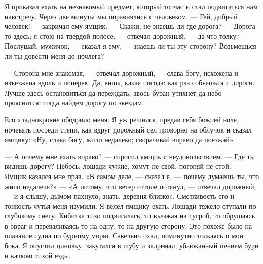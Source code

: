 Я приказал ехать на незнакомый предмет, который тотчас и стал подвигаться нам навстречу. Через две минуты мы поравнялись с человеком.
— Гей, добрый человек! — закричал ему ямщик. — Скажи, не знаешь ли где дорога?
— Дорога-то здесь; я стою на твердой полосе, — отвечал дорожный, — да что толку?
— Послушай, мужичок, — сказал я ему, — знаешь ли ты эту сторону? Возьмешься ли ты довести меня до ночлега?

— Сторона мне знакомая, — отвечал дорожный, — слава богу, исхожена и изъезжена вдоль и поперек. Да, вишь, какая погода: как раз собьешься с дороги. Лучше здесь остановиться да переждать, авось буран утихнет да небо прояснится: тогда найдем дорогу по звездам.

Его хладнокровие ободрило меня. Я уж решился, предав себя божией воле, ночевать посреди степи, как вдруг дорожный сел проворно на облучок и сказал ямщику: «Ну, слава богу, жило недалеко; сворачивай вправо да поезжай».

— А почему мне ехать вправо? — спросил ямщик с неудовольствием. — Где ты видишь дорогу? Небось: лошади чужие, хомут не свой, погоняй не стой. — Ямщик казался мне прав. «В самом деле, — сказал я, — почему думаешь ты, что жило недалече?» — «А потому, что ветер оттоле потянул, — отвечал дорожный, — и я слышу, дымом пахнуло; знать, деревня близко». Сметливость его и тонкость чутья меня изумили. Я велел ямщику ехать. Лошади тяжело ступали по глубокому снегу. Кибитка тихо подвигалась, то въезжая на сугроб, то обрушаясь в овраг и переваливаясь то на одну, то на другую сторону. Это похоже было на плавание судна по бурному морю. Савельич охал, поминутно толкаясь о мои бока. Я опустил циновку, закутался в шубу и задремал, убаюканный пением бури и качкою тихой езды.

